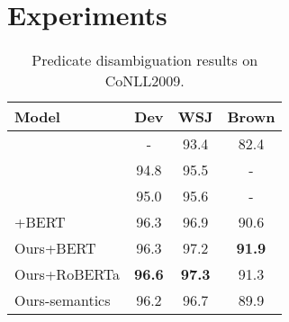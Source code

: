 \documentclass[11pt]{article}
\begin{document}
\section{Experiments}
\begin{table}
\centering
\small 
\begin{tabular}{lccc} 
\toprule
Model                    & Dev   & WSJ   & Brown  \\ 
\midrule
\citet{shi2017joint} & -     & 93.4 & 82.4  \\
\citet{roth-lapata-2016-neural}     & 94.8 & 95.5 & -      \\
\citet{he-etal-2018-syntax} & 95.0 & 95.6 & -      \\
\citet{shi2019simple}{\scriptsize+BERT} & 96.3 & 96.9 & 90.6  \\ 
\midrule
Ours{\scriptsize+BERT}   &   96.3  &  97.2  & \textbf{91.9} \\
Ours{\scriptsize+RoBERTa}  & \textbf{96.6} & \textbf{97.3} & 91.3 \\
Ours{\scriptsize -semantics} &  96.2  & 96.7 & 89.9 \\
\bottomrule
\end{tabular}
\caption{Predicate disambiguation results on CoNLL2009.}
\label{disam}
\end{table}
\end{document}
